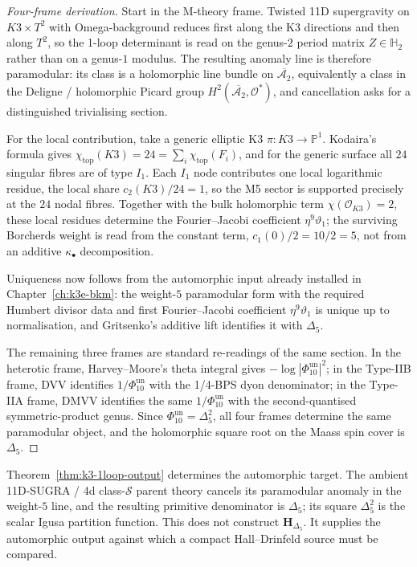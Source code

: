 \begin{proof}[Four-frame derivation]
Start in the M-theory frame. Twisted 11D supergravity on $K3\times T^2$ with
Omega-background reduces first along the K3 directions and then along $T^2$, so the
1-loop determinant is read on the genus-$2$ period matrix
$Z\in\mathbb{H}_2$ rather than on a genus-$1$ modulus. The resulting anomaly line is
therefore paramodular: its class is a holomorphic line bundle on
$\overline{\mathcal{A}_2}$, equivalently a class in the Deligne / holomorphic Picard
group $H^2(\overline{\mathcal{A}_2},\mathcal{O}^*)$, and cancellation asks for a
distinguished trivialising section.

For the local contribution, take a generic elliptic K3
$\pi\colon K3\to\mathbb{P}^1$. Kodaira's formula gives
$\chi_{\mathrm{top}}(K3)=24=\sum_i \chi_{\mathrm{top}}(F_i)$, and for the generic
surface all $24$ singular fibres are of type $I_1$. Each $I_1$ node contributes one
local logarithmic residue, the local share $c_2(K3)/24=1$, so the M5 sector is
supported precisely at the $24$ nodal fibres. Together with the bulk
holomorphic term $\chi(\mathcal{O}_{K3})=2$, these local residues determine
the Fourier--Jacobi coefficient $\eta^9\vartheta_1$; the surviving
Borcherds weight is read from the constant term, $c_1(0)/2=10/2=5$, not
from an additive $\kappa_\bullet$ decomposition.

Uniqueness now follows from the automorphic input already installed in
Chapter~\ref{ch:k3e-bkm}: the weight-$5$ paramodular form with the required Humbert
divisor data and first Fourier--Jacobi coefficient $\eta^9\vartheta_1$ is unique up to
normalisation, and Gritsenko's additive lift identifies it with $\Delta_5$.

The remaining three frames are standard re-readings of the same section. In the
heterotic frame, Harvey--Moore's theta integral gives
$-\log|\Phi_{10}^{\mathrm{un}}|^2$; in the Type-IIB frame, DVV identifies
$1/\Phi_{10}^{\mathrm{un}}$ with the
1/4-BPS dyon denominator; in the Type-IIA frame, DMVV identifies the same
$1/\Phi_{10}^{\mathrm{un}}$ with the second-quantised symmetric-product genus. Since
\(\Phi_{10}^{\mathrm{un}}=\Delta_5^2\), all four frames determine the same paramodular object, and the
holomorphic square root on the Maass spin cover is $\Delta_5$.
\end{proof}

\begin{remark}
\label{rem:delta5-as-output}
Theorem~\ref{thm:k3-1loop-output} determines the automorphic target.  The
ambient 11D-SUGRA / 4d class-$\mathcal{S}$ parent theory cancels its
paramodular anomaly in the weight-$5$ line, and the resulting primitive
denominator is $\Delta_5$; its square $\Delta_5^2$ is the scalar Igusa
partition function.  This does not construct
$\mathbf{H}_{\Delta_5}$.  It supplies the automorphic output against which
a compact Hall--Drinfeld source must be compared.
\end{remark}

